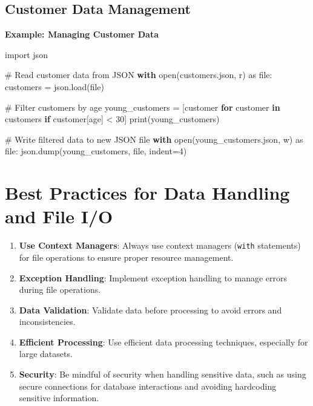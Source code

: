 \documentclass[
  letterpaper,
  DIV=11,
  numbers=noendperiod]{scrreprt}
\newenvironment{Shaded}{\begin{snugshade}}{\end{snugshade}}
\newcommand{\BuiltInTok}[1]{\textcolor[rgb]{0.00,0.23,0.31}{#1}}
\newcommand{\CommentTok}[1]{\textcolor[rgb]{0.37,0.37,0.37}{#1}}
\newcommand{\ControlFlowTok}[1]{\textcolor[rgb]{0.00,0.23,0.31}{\textbf{#1}}}
\newcommand{\DecValTok}[1]{\textcolor[rgb]{0.68,0.00,0.00}{#1}}
\newcommand{\ImportTok}[1]{\textcolor[rgb]{0.00,0.46,0.62}{#1}}
\newcommand{\KeywordTok}[1]{\textcolor[rgb]{0.00,0.23,0.31}{\textbf{#1}}}
\newcommand{\NormalTok}[1]{\textcolor[rgb]{0.00,0.23,0.31}{#1}}
\newcommand{\OperatorTok}[1]{\textcolor[rgb]{0.37,0.37,0.37}{#1}}
\newcommand{\StringTok}[1]{\textcolor[rgb]{0.13,0.47,0.30}{#1}}
\providecommand{\tightlist}{%
  \setlength{\itemsep}{0pt}\setlength{\parskip}{0pt}}\usepackage{longtable,booktabs,array}
\begin{document}
\subsection{Customer Data Management}\label{customer-data-management}

\textbf{Example: Managing Customer Data}

\begin{Shaded}
\begin{Highlighting}[]
\ImportTok{import}\NormalTok{ json}

\CommentTok{\# Read customer data from JSON}
\ControlFlowTok{with} \BuiltInTok{open}\NormalTok{(}\StringTok{\textquotesingle{}customers.json\textquotesingle{}}\NormalTok{, }\StringTok{\textquotesingle{}r\textquotesingle{}}\NormalTok{) }\ImportTok{as} \BuiltInTok{file}\NormalTok{:}
\NormalTok{    customers }\OperatorTok{=}\NormalTok{ json.load(}\BuiltInTok{file}\NormalTok{)}

\CommentTok{\# Filter customers by age}
\NormalTok{young\_customers }\OperatorTok{=}\NormalTok{ [customer }\ControlFlowTok{for}\NormalTok{ customer }\KeywordTok{in}\NormalTok{ customers }\ControlFlowTok{if}\NormalTok{ customer[}\StringTok{\textquotesingle{}age\textquotesingle{}}\NormalTok{] }\OperatorTok{\textless{}} \DecValTok{30}\NormalTok{]}
\BuiltInTok{print}\NormalTok{(young\_customers)}

\CommentTok{\# Write filtered data to new JSON file}
\ControlFlowTok{with} \BuiltInTok{open}\NormalTok{(}\StringTok{\textquotesingle{}young\_customers.json\textquotesingle{}}\NormalTok{, }\StringTok{\textquotesingle{}w\textquotesingle{}}\NormalTok{) }\ImportTok{as} \BuiltInTok{file}\NormalTok{:}
\NormalTok{    json.dump(young\_customers, }\BuiltInTok{file}\NormalTok{, indent}\OperatorTok{=}\DecValTok{4}\NormalTok{)}
\end{Highlighting}
\end{Shaded}

\section{Best Practices for Data Handling and File
I/O}\label{best-practices-for-data-handling-and-file-io}

\begin{enumerate}
\def\labelenumi{\arabic{enumi}.}
\tightlist
\item
  \textbf{Use Context Managers}: Always use context managers
  (\texttt{with} statements) for file operations to ensure proper
  resource management.
\item
  \textbf{Exception Handling}: Implement exception handling to manage
  errors during file operations.
\item
  \textbf{Data Validation}: Validate data before processing to avoid
  errors and inconsistencies.
\item
  \textbf{Efficient Processing}: Use efficient data processing
  techniques, especially for large datasets.
\item
  \textbf{Security}: Be mindful of security when handling sensitive
  data, such as using secure connections for database interactions and
  avoiding hardcoding sensitive information.
\end{enumerate}
\end{document}
